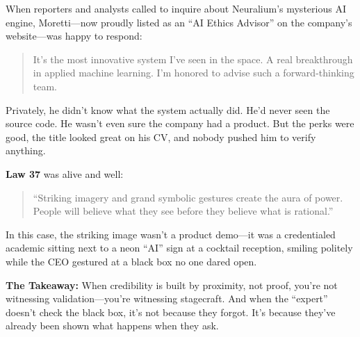 When reporters and analysts called to inquire about Neuralium’s mysterious AI engine, Moretti—now proudly listed as an “AI Ethics Advisor” on the company’s website—was happy to respond:
\begin{quote}
It’s the most innovative system I’ve seen in the space. A real breakthrough in applied machine learning. I’m honored to advise such a forward-thinking team.
\end{quote}

Privately, he didn’t know what the system actually did. He’d never seen the source code. He wasn’t even sure the company had a product. But the perks were good, the title looked great on his CV, and nobody pushed him to verify anything.

\medskip

\textbf{Law 37} was alive and well:
\begin{quote}
“Striking imagery and grand symbolic gestures create the aura of power. People will believe what they see before they believe what is rational.”
\end{quote}

In this case, the striking image wasn’t a product demo—it was a credentialed academic sitting next to a neon “AI” sign at a cocktail reception, smiling politely while the CEO gestured at a black box no one dared open.

\medskip

\textbf{The Takeaway:}  
When credibility is built by proximity, not proof, you’re not witnessing validation—you’re witnessing stagecraft.  
And when the “expert” doesn’t check the black box, it’s not because they forgot. It’s because they’ve already been shown what happens when they ask.

